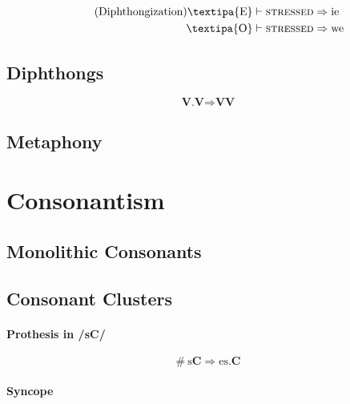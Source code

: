 \documentclass{report}
\begin{document}
\begin{tcolorbox}[title=Diphthongization]
  \begin{align*}\tag{Diphthongization}\label{eq:diphthongization}
      \text{\textipa{E}} \vdash \textsc{stressed} & \Rightarrow \text{ie} \\
      \text{\textipa{O}} \vdash \textsc{stressed} & \Rightarrow \text{we}
  \end{align*}
\end{tcolorbox}

\subsection{Diphthongs}

\begin{tcolorbox}[title=Loss of Hiatus]
  \begin{equation}\tag{Loss of Hiatus}\label{eq:loss_of_hiatus}
    \textbf{V.V} \Rightarrow \textbf{VV}
  \end{equation}
\end{tcolorbox}

\subsection{Metaphony}

\section{Consonantism}

\subsection{Monolithic Consonants}

\subsection{Consonant Clusters}

\paragraph{Prothesis in /sC/}

\begin{equation}
  \#\ \text{s}\textbf{C} \Rightarrow \text{es}.\textbf{C}
\end{equation}

\paragraph{Syncope}
\end{document}

